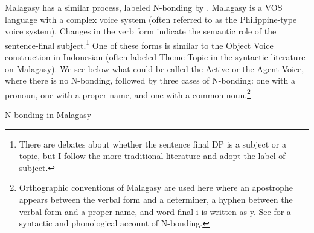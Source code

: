 \documentclass[output=paper,colorlinks,citecolor=brown,
]{langscibook}
\begin{document}
Malagasy has a similar process, labeled  N-bonding by \citet{Keenan:2000}.  Malagasy is a VOS language with a complex voice system (often referred to as the Philippine-type voice system).  Changes in the verb form indicate the semantic role of the sentence-final subject.\footnote{There are debates about whether the sentence final DP is a subject or a topic, but I follow the more traditional literature and adopt the label of subject.}  One of these forms is similar to the Object Voice construction in Indonesian (often labeled Theme Topic in the syntactic literature on Malagasy).  We see below what could be called the Active or the Agent Voice, where there is no N-bonding, followed by three cases of N-bonding: one with a pronoun, one with a proper name, and one with a common noun.\footnote{Orthographic conventions of Malagasy are used here where an apostrophe appears between the verbal form and a determiner, a hyphen between the verbal form and a proper name, and word final i is written as y. See \citet{Ting:2021} for a syntactic and phonological account of N-bonding.}

\ea N-bonding in Malagasy
\z
\z
\end{document}
